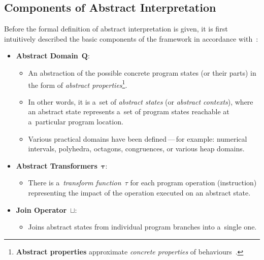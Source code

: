 \vfill

\subsection{Components of Abstract Interpretation}
\label{sec:AIComponents}

Before the formal definition of abstract interpretation is given, it is first intuitively described the basic components of the framework in accordance with~\cite{AICousotWeb, AIBasedFormalMethodsCousot, savAI, programAnalysisNielson}:
\begin{samepage}
\begin{itemize}
    \item \textbf{Abstract Domain}~$ \boldsymbol{Q} $:
        \begin{itemize}
            \item An abstraction of the possible concrete program states (or their parts) in the form of \emph{abstract properties}\footnote{\textbf{Abstract properties} approximate \emph{concrete properties} of behaviours~\cite{AIBasedFormalMethodsCousot}.}.

            \item In other words, it is a~set of \emph{abstract states} (or \emph{abstract contexts}), where an abstract state represents a~set of program states reachable at a~particular program location.

            \item Various practical domains have been defined\,---\,for example: numerical intervals, polyhedra, octagons, congruences, or various heap domains.
        \end{itemize}

    \item \textbf{Abstract Transformers}~$ \boldsymbol{\tau} $:
        \begin{itemize}
            \item There is a~\emph{transform function}~$ \tau $ for each program operation (instruction) representing the impact of the operation executed on an abstract state.
        \end{itemize}

    \item \textbf{Join Operator}~$ \boldsymbol{\sqcup} $:
        \begin{itemize}
            \item Joins abstract states from individual program branches into a~single one.
        \end{itemize}


\end{itemize}
\end{samepage}
